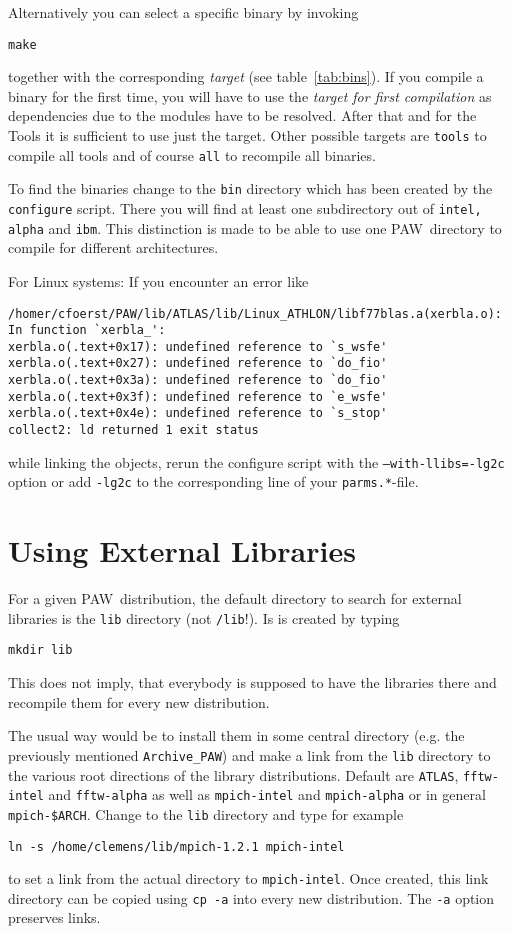 \documentclass[a4paper,10pt]{article}
\newcommand{\PAW}{\textsc{PAW}}
\begin{document}
Alternatively you can select a specific binary by invoking
\begin{verbatim}
make
\end{verbatim}
together with the corresponding \emph{target} (see table~\ref{tab:bins}).  If
you compile a binary for the first time, you will have to use the \emph{target
for first compilation} as dependencies due to the modules have to be
resolved. After that and for the Tools it is sufficient to use just the target.
Other possible targets are \texttt{tools} to compile all tools and of course
\texttt{all} to recompile all binaries.

To find the binaries change to the \texttt{bin} directory which has been
created by the \texttt{configure} script.  There you will find at least one
subdirectory out of \texttt{intel, alpha} and \texttt{ibm}.  This distinction
is made to be able to use one \PAW\ directory to compile for different
architectures.

For Linux systems: If you encounter an error like 
\begin{verbatim}
/homer/cfoerst/PAW/lib/ATLAS/lib/Linux_ATHLON/libf77blas.a(xerbla.o): 
In function `xerbla_':
xerbla.o(.text+0x17): undefined reference to `s_wsfe'
xerbla.o(.text+0x27): undefined reference to `do_fio'
xerbla.o(.text+0x3a): undefined reference to `do_fio'
xerbla.o(.text+0x3f): undefined reference to `e_wsfe'
xerbla.o(.text+0x4e): undefined reference to `s_stop'
collect2: ld returned 1 exit status
\end{verbatim}
while linking the objects, rerun the configure script with the
\texttt{--with-llibs=-lg2c} option or add \texttt{-lg2c} to the corresponding
line of your \texttt{parms.*}-file.



\section{Using External Libraries}
\label{sec:libs}

For a given \PAW\ distribution, the default directory to search for external
libraries is the \texttt{lib} directory (not \texttt{/lib}!). Is is created by typing
\begin{verbatim}
mkdir lib
\end{verbatim}
This does not imply, that everybody is supposed to have the libraries there and
recompile them for every new distribution.

The usual way would be to install them in some central directory (e.g. the
previously mentioned \texttt{Archive\_PAW}) and make a link from the
\texttt{lib} directory to the various root directions of the library
distributions.  Default are \texttt{ATLAS}, \texttt{fftw-intel} and
\texttt{fftw-alpha} as well as \texttt{mpich-intel} and \texttt{mpich-alpha} or
in general \texttt{mpich-\$ARCH}.
Change to the \texttt{lib} directory and type for example
\begin{verbatim}
ln -s /home/clemens/lib/mpich-1.2.1 mpich-intel
\end{verbatim}
to set a link from the actual directory to \texttt{mpich-intel}.  Once created,
this link directory can be copied using \texttt{cp -a} into every new
distribution. The \texttt{-a} option preserves links.
\end{document}
